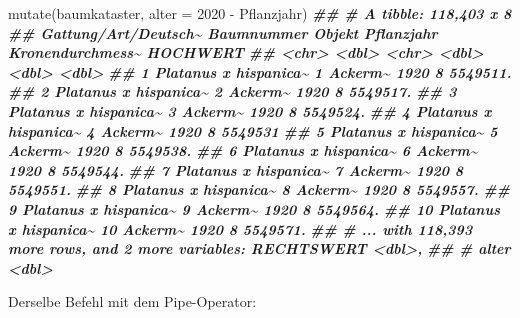 \documentclass[
  ngerman,
]{article}
\newenvironment{Shaded}{\begin{snugshade}}{\end{snugshade}}
\newcommand{\AttributeTok}[1]{\textcolor[rgb]{0.77,0.63,0.00}{#1}}
\newcommand{\DecValTok}[1]{\textcolor[rgb]{0.00,0.00,0.81}{#1}}
\newcommand{\DocumentationTok}[1]{\textcolor[rgb]{0.56,0.35,0.01}{\textbf{\textit{#1}}}}
\newcommand{\FunctionTok}[1]{\textcolor[rgb]{0.00,0.00,0.00}{#1}}
\newcommand{\NormalTok}[1]{#1}
\newcommand{\SpecialCharTok}[1]{\textcolor[rgb]{0.00,0.00,0.00}{#1}}
\begin{document}
\begin{Shaded}
\begin{Highlighting}[]
\FunctionTok{mutate}\NormalTok{(baumkataster, }\AttributeTok{alter =} \DecValTok{2020} \SpecialCharTok{{-}}\NormalTok{ Pflanzjahr)}
\DocumentationTok{\#\# \# A tibble: 118,403 x 8}
\DocumentationTok{\#\#    \textasciigrave{}Gattung/Art/Deutsch\textasciitilde{} Baumnummer Objekt  Pflanzjahr Kronendurchmess\textasciitilde{} HOCHWERT}
\DocumentationTok{\#\#    \textless{}chr\textgreater{}                      \textless{}dbl\textgreater{} \textless{}chr\textgreater{}        \textless{}dbl\textgreater{}            \textless{}dbl\textgreater{}    \textless{}dbl\textgreater{}}
\DocumentationTok{\#\#  1 Platanus x hispanica\textasciitilde{}          1 Ackerm\textasciitilde{}       1920                8 5549511.}
\DocumentationTok{\#\#  2 Platanus x hispanica\textasciitilde{}          2 Ackerm\textasciitilde{}       1920                8 5549517.}
\DocumentationTok{\#\#  3 Platanus x hispanica\textasciitilde{}          3 Ackerm\textasciitilde{}       1920                8 5549524.}
\DocumentationTok{\#\#  4 Platanus x hispanica\textasciitilde{}          4 Ackerm\textasciitilde{}       1920                8 5549531 }
\DocumentationTok{\#\#  5 Platanus x hispanica\textasciitilde{}          5 Ackerm\textasciitilde{}       1920                8 5549538.}
\DocumentationTok{\#\#  6 Platanus x hispanica\textasciitilde{}          6 Ackerm\textasciitilde{}       1920                8 5549544.}
\DocumentationTok{\#\#  7 Platanus x hispanica\textasciitilde{}          7 Ackerm\textasciitilde{}       1920                8 5549551.}
\DocumentationTok{\#\#  8 Platanus x hispanica\textasciitilde{}          8 Ackerm\textasciitilde{}       1920                8 5549557.}
\DocumentationTok{\#\#  9 Platanus x hispanica\textasciitilde{}          9 Ackerm\textasciitilde{}       1920                8 5549564.}
\DocumentationTok{\#\# 10 Platanus x hispanica\textasciitilde{}         10 Ackerm\textasciitilde{}       1920                8 5549571.}
\DocumentationTok{\#\# \# ... with 118,393 more rows, and 2 more variables: RECHTSWERT \textless{}dbl\textgreater{},}
\DocumentationTok{\#\# \#   alter \textless{}dbl\textgreater{}}
\end{Highlighting}
\end{Shaded}

Derselbe Befehl mit dem Pipe-Operator:
\end{document}

